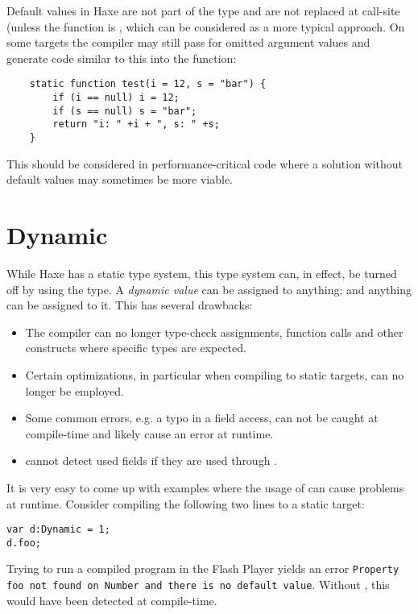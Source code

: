 
Default values in Haxe are not part of the type and are not replaced at call-site (unless the function is , which can be considered as a more typical approach. On some targets the compiler may still pass  for omitted argument values and generate code similar to this into the function:
\begin{lstlisting}
	static function test(i = 12, s = "bar") {
		if (i == null) i = 12;
		if (s == null) s = "bar";
		return "i: " +i + ", s: " +s;
	}
\end{lstlisting}
This should be considered in performance-critical code where a solution without default values may sometimes be more viable.




\section{Dynamic}
\label{types-dynamic}

While Haxe has a static type system, this type system can, in effect, be turned off by using the  type. A \emph{dynamic value} can be assigned to anything; and anything can be assigned to it. This has several drawbacks:

\begin{itemize}
	\item The compiler can no longer type-check assignments, function calls and other constructs where specific types are expected.
	\item Certain optimizations, in particular when compiling to static targets, can no longer be employed.
	\item Some common errors, e.g. a typo in a field access, can not be caught at compile-time and likely cause an error at runtime.
	\item {} cannot detect used fields if they are used through .
\end{itemize}
It is very easy to come up with examples where the usage of  can cause problems at runtime. Consider compiling the following two lines to a static target:

\begin{lstlisting}
var d:Dynamic = 1;
d.foo;
\end{lstlisting}

Trying to run a compiled program in the Flash Player yields an error \texttt{Property foo not found on Number and there is no default value}. Without , this would have been detected at compile-time.

